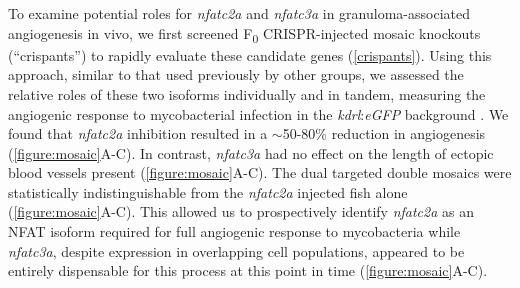 To examine potential roles for \textit{nfatc2a} and \textit{nfatc3a} in granuloma\hyp{}associated angiogenesis in vivo, we first screened F\textsubscript{0} CRISPR\hyp{}injected mosaic knockouts (``crispants'') to rapidly evaluate these candidate genes (\autoref{crispants}). Using this approach, similar to that used previously by other groups, we assessed the relative roles of these two isoforms individually and in tandem, measuring the angiogenic response to mycobacterial infection in the \textit{kdrl}:\textit{eGFP} background \citep{Jao2013, Hoshijima2016, Wu2018, Hoshijima2019, Kroll2021}. We found that \textit{nfatc2a} inhibition resulted in a $\sim$50\hyp{}80\% reduction in angiogenesis (\autoref{figure:mosaic}A\hyp{}C). In contrast, \textit{nfatc3a} had no effect on the length of ectopic blood vessels present (\autoref{figure:mosaic}A\hyp{}C). The dual targeted double mosaics were statistically indistinguishable from the \textit{nfatc2a} injected fish alone (\autoref{figure:mosaic}A\hyp{}C). This allowed us to prospectively identify \textit{nfatc2a} as an NFAT isoform required for full angiogenic response to mycobacteria while \textit{nfatc3a}, despite expression in overlapping cell populations, appeared to be entirely dispensable for this process at this point in time (\autoref{figure:mosaic}A\hyp{}C). 

